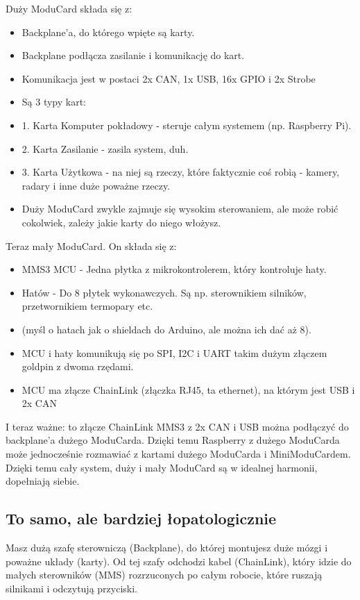 \documentclass[b5paper, 10pt, twoside]{book}
\begin{document}
Duży ModuCard składa się z:
\begin{itemize}
  \item Backplane'a, do którego wpięte są karty.
  \item Backplane podłącza zasilanie i komunikację do kart.
  \item Komunikacja jest w postaci 2x CAN, 1x USB, 16x GPIO i 2x Strobe
  \item Są 3 typy kart:
  \item 1. Karta Komputer pokładowy - steruje całym systemem (np. Raspberry Pi).
  \item 2. Karta Zasilanie - zasila system, duh.
  \item 3. Karta Użytkowa - na niej są rzeczy, które faktycznie coś robią - kamery, radary i inne duże poważne rzeczy.
  \item Duży ModuCard zwykle zajmuje się wysokim sterowaniem, ale może robić cokolwiek, zależy jakie karty do niego włożysz.
\end{itemize}

Teraz mały ModuCard. On składa się z:

\begin{itemize}
  \item MMS3 MCU - Jedna płytka z mikrokontrolerem, który kontroluje haty.
  \item Hatów - Do 8 płytek wykonawczych. Są np. sterownikiem silników, przetwornikiem termopary etc.
  \item (myśl o hatach jak o shieldach do Arduino, ale można ich dać aż 8).
  \item MCU i haty komunikują się po SPI, I2C i UART takim dużym złączem goldpin z dwoma rzędami.
  \item MCU ma złącze ChainLink (złączka RJ45, ta ethernet), na którym jest USB i 2x CAN
\end{itemize}

I teraz ważne: to złącze ChainLink MMS3 z 2x CAN i USB można podłączyć do backplane'a dużego ModuCarda. Dzięki temu Raspberry z dużego ModuCarda może jednocześnie rozmawiać z kartami dużego ModuCarda i MiniModuCardem. Dzięki temu cały system, duży i mały
ModuCard są w idealnej harmonii, dopełniają siebie.

\subsection{To samo, ale bardziej łopatologicznie}
Masz dużą szafę sterowniczą (Backplane), do której montujesz duże mózgi i poważne układy (karty). Od tej szafy odchodzi kabel (ChainLink), który idzie do małych sterowników (MMS) rozrzuconych po całym robocie, które ruszają silnikami i odczytują przyciski.
\end{document}
